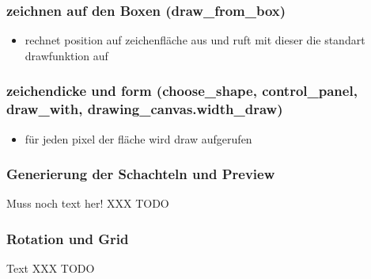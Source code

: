 \subsubsection{zeichnen auf den Boxen (draw\_from\_box)}
\label{subsubsec:zeichenAufBoxen}

\begin{itemize}
\item rechnet position auf zeichenfläche aus und ruft mit dieser die standart
drawfunktion auf
\end{itemize}


\subsubsection{zeichendicke und form (choose\_shape, control\_panel, draw\_with,
drawing\_canvas.width\_draw)}
\label{subsubsec:zeichendickeForm}

\begin{itemize}
\item für jeden pixel der fläche wird draw aufgerufen
\end{itemize}


\subsubsection{Generierung der Schachteln und Preview}
\label{subsubsec:generierungPreview}
Muss noch text her! XXX TODO


\subsubsection{Rotation und Grid}
\label{subsubsec:rotationGrid}
Text XXX TODO
